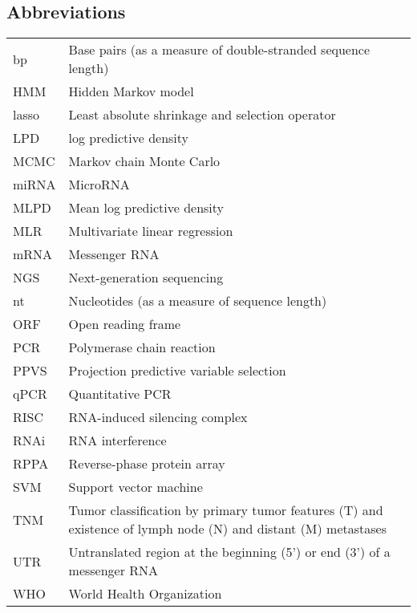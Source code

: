 \documentclass[english,12pt,a4paper,pdftex,elec,utf8]{aaltothesis}
\begin{document}

\subsection*{Abbreviations}

\begin{tabular}{lp{11cm}}
bp          & Base pairs (as a measure of double-stranded sequence length) \\
HMM         & Hidden Markov model \\
lasso       & Least absolute shrinkage and selection operator \\
LPD         & log predictive density \\
MCMC        & Markov chain Monte Carlo \\
miRNA       & MicroRNA \\
MLPD        & Mean log predictive density \\
MLR         & Multivariate linear regression \\
mRNA        & Messenger RNA \\
NGS         & Next-generation sequencing \\
nt          & Nucleotides (as a measure of sequence length) \\
ORF         & Open reading frame \\
PCR         & Polymerase chain reaction \\
PPVS        & Projection predictive variable selection \\
qPCR        & Quantitative PCR \\
RISC        & RNA-induced silencing complex \\
RNAi        & RNA interference \\
RPPA        & Reverse-phase protein array \\
SVM         & Support vector machine \\
TNM         & Tumor classification by primary tumor features (T) and existence of lymph node (N) and distant (M) metastases \\
UTR         & Untranslated region at the beginning (5') or end (3') of a messenger RNA \\
WHO         & World Health Organization \\
\end{tabular}
\end{document}
